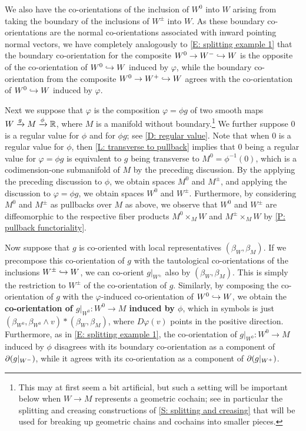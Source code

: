 \begin{example}
	We also have the co-orientations of the inclusion of $W^0$ into $W$ arising from taking the boundary of the inclusions of $W^{\pm}$ into $W$.
	As these boundary co-orientations are the normal co-orientations associated with inward pointing normal vectors, we have completely analogously to \cref{E: splitting example 1} that the boundary co-orientation for the composite $W^0 \to W^- \hookrightarrow W$ is the opposite of the co-orientation of $W^0\hookrightarrow W$ induced by $\varphi$, while the boundary co-orientation from the composite $W^0 \to W^+ \hookrightarrow W$ agrees with the co-orientation of $W^0\hookrightarrow W$ induced by $\varphi$.

	Next we suppose that $\varphi$ is the composition $\varphi = \phi g$ of two smooth maps $W \xrightarrow{g} M \xrightarrow{\phi}\mathbb{R}$, where $M$ is a manifold without boundary.\footnote{This may at first seem a bit artificial, but such a setting will be important below when $W \to M$ represents a geometric cochain; see in particular the splitting and creasing constructions of \cref{S: splitting and creasing} that will be used for breaking up geometric chains and cochains into smaller pieces.}
	We further suppose $0$ is a regular value for $\phi$ and for $\phi g$; see \cref{D: regular value}.
	Note that when $0$ is a regular value for $\phi$, then \cref{L: transverse to pullback} implies that $0$ being a regular value for $\varphi = \phi g$ is equivalent to $g$ being transverse to $M^0 = \phi^{-1}(0)$, which is a codimension-one submanifold of $M$ by the preceding discussion.
	By the applying the preceding discussion to $\phi$, we obtain spaces $M^0$ and $M^\pm$, and applying the discussion to $\varphi = \phi g$, we obtain spaces $W^0$ and $W^\pm$.
	Furthermore, by considering $M^0$ and $M^\pm$ as pullbacks over $M$ as above, we observe that $W^0$ and $W^\pm$ are diffeomorphic to the respective fiber products $M^0 \times_M W$ and $M^{\pm} \times_M W$ by \cref{P: pullback functoriality}.


	Now suppose that $g$ is co-oriented with local representatives $(\beta_W, \beta_M)$.
	If we precompose this co-orientation of $g$ with the tautological co-orientations of the inclusions $W^\pm \hookrightarrow W$, we can co-orient $g|_{W^\pm}$ also by $(\beta_W, \beta_M)$.
	This is simply the restriction to $W^\pm$ of the co-orientation of $g$.
	Similarly, by composing the co-orientation of $g$ with the $\varphi$-induced co-orientation of $W^0 \hookrightarrow W$, we obtain the \textbf{co-orientation of $g|_{W^0} \colon W^0 \to M$ induced by $\phi$}, which in symbols is just $(\beta_{W^0}, \beta_{W^0} \wedge v)*(\beta_W,\beta_M)$, where $D\varphi(v)$ points in the positive direction.
	Furthermore, as in \cref{E: splitting example 1}, the co-orientation of $g|_{W^0} \colon W^0 \to M$ induced by $\phi$ disagrees with its boundary co-orientation as a component of $\partial(g|_{W^-})$, while it agrees with its co-orientation as a component of $\partial(g|_{W^+})$.


\end{example}
